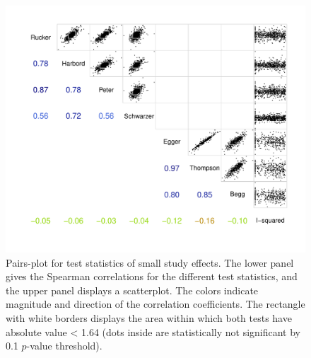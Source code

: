 \documentclass[11pt,a4paper,twoside]{book}\usepackage[]{graphicx}\usepackage[]{color}
\newenvironment{knitrout}{}{} %
\begin{document}
\begin{figure}
\begin{knitrout}
\color{fgcolor}

{\centering \includegraphics[width=\textwidth-3cm]{figure/ch03_figunnamed-chunk-15-1} 

}



\end{knitrout}
\caption{Pairs-plot for test statistics of small study effects. The lower panel gives the Spearman correlations for the different test statistics, and the upper panel displays a scatterplot. The colors indicate magnitude and direction of the correlation coefficients. The rectangle with white borders displays the area within which both tests have absolute value < 1.64 (dots inside are statistically not significant by 0.1 $p$-value threshold).}
\label{fig:test.agreement}
\end{figure}
\end{document}
